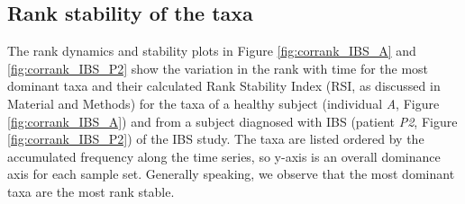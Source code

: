 \subsection*{Rank stability of the taxa} 

\def \RSItable {
\scriptsize
	\begin{tabular}{cccr}
	\multicolumn{4}{c}{Colour code for the RSI percentage column} \\
    \hline
    Case  &  Condition  &  Colour  &  Description \\
    \hline
    1  &  $1\ge{\rm RSI}>0.99$  & \textcolor{blue}{blue} & constant rank \\ 
    2  &  $0.99\ge{\rm RSI}>0.90$  &  \textcolor{green}{green}  & highly stable rank \\
    3  &  $0.90\ge{\rm RSI}>0.75$  &  \textcolor{orange}{orange} & moderately stable rank \\
    4  &  $0.75\ge{\rm RSI}>0.25$  &  \textcolor{red}{red} & unstable rank \\
    5  &  $0.25\ge{\rm RSI}\ge0$  &  \bfseries{black} & very unstable rank \\
    \hline
    \end{tabular}	
}

The rank dynamics and stability plots in Figure \ref{fig:corrank_IBS_A} and \ref{fig:corrank_IBS_P2} show the variation in the rank with time for the most dominant taxa and their calculated Rank Stability Index (RSI, as discussed in Material and Methods) for the taxa of a healthy subject (individual \emph{A}, Figure \ref{fig:corrank_IBS_A}) and from a subject diagnosed with IBS (patient \emph{P2}, Figure \ref{fig:corrank_IBS_P2}) of the IBS study\cite{IBS}. The taxa are listed ordered by the accumulated frequency along the time series, so y-axis is an overall dominance axis for each sample set. Generally speaking, we observe that the most dominant taxa are the most rank stable. 

